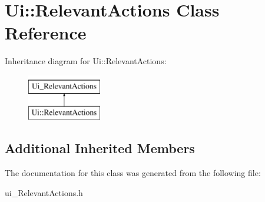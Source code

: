 \hypertarget{class_ui_1_1_relevant_actions}{\section{Ui\-:\-:Relevant\-Actions Class Reference}
\label{class_ui_1_1_relevant_actions}
}
Inheritance diagram for Ui\-:\-:Relevant\-Actions\-:\begin{figure}[H]
\begin{center}
\leavevmode
\includegraphics[height=2.000000cm]{class_ui_1_1_relevant_actions}
\end{center}
\end{figure}
\subsection*{Additional Inherited Members}


The documentation for this class was generated from the following file\-:\begin{DoxyCompactItemize}
\item 
ui\-\_\-\-Relevant\-Actions.\-h\end{DoxyCompactItemize}

